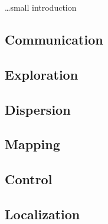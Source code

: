 \ldots small introduction
    \subsection{Communication}
    \subsection{Exploration}
    \subsection{Dispersion}
    \subsection{Mapping}
    \subsection{Control}
    \subsection{Localization}